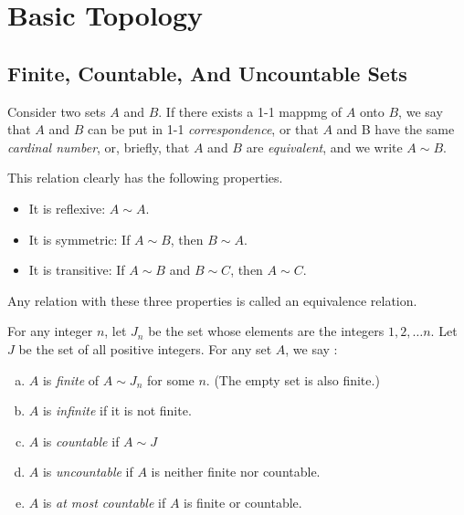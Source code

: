 

\chapter{Basic Topology}

\bigbreak
\section{Finite, Countable, And Uncountable Sets}

\begin{defn}
	Consider two sets $A$ and $B$.
	If there exists a 1-1  mappmg of $A$ onto $B$, 
	we say that $A$ and $B$ can be put in 1-1 {\it correspondence}, 
	or that $A$ and B have the same {\it cardinal number}, 
	or, briefly, that $A$ and $B$ are {\it equivalent}, 
	and we write $A \sim B$. 
	
	This relation clearly has the following properties. 
	\begin{itemize}
		\item It is reflexive: $A \sim A$. 
		\item It is symmetric: If $A \sim B$, then $B \sim A$. 
		\item It is transitive: If $A \sim B$ and $B \sim C$, then $A \sim C$. 
	\end{itemize}
	Any relation with these three properties is  called an equivalence relation.
\end{defn}


\begin{defn}
	\label{count}
	For any integer $n$, let $J_n$ be the set whose elements are the integers $1, 2, \dots n$.
	Let $J$ be the set of all positive integers. For any set $A$, we say :
	\begin{enumerate}[(a)]
		\item $A$ is {\it finite} of $A \sim J_n$ for some $n$. (The empty set is also finite.)
		\item $A$ is {\it infinite} if it is not finite.
		\item $A$ is {\it countable} if $A \sim J$
		\item $A$ is {\it uncountable} if $A$ is neither finite nor countable.
		\item $A$ is {\it at most countable} if $A$ is finite or countable.
	\end{enumerate}
\end{defn}



